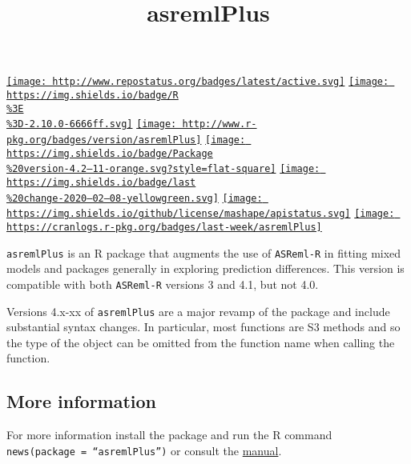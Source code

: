 \documentclass[
]{article}
\title{asremlPlus}
\author{}
\date{\vspace{-2.5em}}
\begin{document}
\maketitle

\href{http://www.repostatus.org/\#active}{\texttt{[image: http://www.repostatus.org/badges/latest/active.svg]}}
\href{https://cran.r-project.org/}{\texttt{[image: https://img.shields.io/badge/R\\\%3E\\\%3D-2.10.0-6666ff.svg]}}
\href{https://cran.r-project.org/package=asremlPlus}{\texttt{[image: http://www.r-pkg.org/badges/version/asremlPlus]}}
\href{/commits/master}{\texttt{[image: https://img.shields.io/badge/Package\\\%20version-4.2--11-orange.svg?style=flat-square]}}
\href{/commits/master}{\texttt{[image: https://img.shields.io/badge/last\\\%20change-2020--02--08-yellowgreen.svg]}}
\href{http://choosealicense.com/licenses/mit/}{\texttt{[image: https://img.shields.io/github/license/mashape/apistatus.svg]}}
\href{commits/master}{\texttt{[image: https://cranlogs.r-pkg.org/badges/last-week/asremlPlus]}}

\texttt{asremlPlus} is an R package that augments the use of
\texttt{ASReml-R} in fitting mixed models and packages generally in
exploring prediction differences. This version is compatible with both
\texttt{ASReml-R} versions 3 and 4.1, but not 4.0.

Versions 4.x-xx of \texttt{asremlPlus} are a major revamp of the package
and include substantial syntax changes. In particular, most functions
are S3 methods and so the type of the object can be omitted from the
function name when calling the function.

\hypertarget{more-information}{%
\subsection{More information}\label{more-information}}

For more information install the package and run the R command
\texttt{news(package\ =\ “asremlPlus”)} or consult the
\href{./vignettes/asremlPlus-manual.pdf}{manual}.
\end{document}

